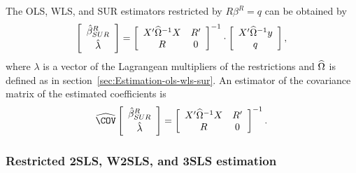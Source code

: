 The OLS, WLS, and SUR estimators restricted by $R \beta^R = q$ can be obtained by
\begin{equation}
   \left[ \begin{array}{c}
      \hat{\beta}^R_{SUR} \\[0.2em] \hat{\lambda}
   \end{array} \right]
   =
   \left[ \begin{array}{cc}
      X' \widehat{\Omega}^{-1} X & R' \\
      R & 0
   \end{array} \right]^{-1}
   \cdot
   \left[ \begin{array}{c}
      X' \widehat{\Omega}^{-1} y \\ q
   \end{array} \right] ,
   \label{eq:ols-wls-sur-r}
\end{equation}
where $\lambda$ is a vector of the Lagrangean multipliers of the restrictions
and $\widehat{\Omega}$ is defined as in section~\ref{sec:Estimation-ols-wls-sur}.
An estimator of the covariance matrix of the estimated coefficients is
\begin{equation}
   \COVHat
   \left[ \begin{array}{c}
      \bHat^R_{SUR} \\[0.2em] \lHat
   \end{array} \right] 
   = 
   \left[ \begin{array}{cc}
      X' \OHat^{-1} X & R' \\
      R & 0
   \end{array} \right]^{-1} .
   \label{eq:cov-ols-wls-sur-r}
\end{equation}

\subsubsection{Restricted 2SLS, W2SLS, and 3SLS estimation}

